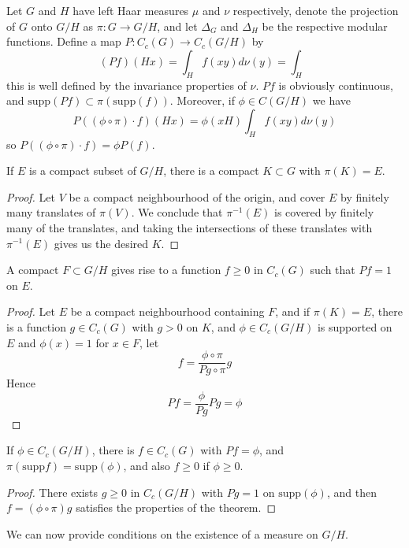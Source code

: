 Let $G$ and $H$ have left Haar measures $\mu$ and $\nu$ respectively, denote the projection of $G$ onto $G/H$ as $\pi: G \to G/H$, and let $\Delta_G$ and $\Delta_H$ be the respective modular functions. Define a map $P: C_c(G) \to C_c(G/H)$ by
%
\[ (Pf)(Hx) = \int_H f(xy) d\nu(y) = \int_H  \]
%
this is well defined by the invariance properties of $\nu$. $Pf$ is obviously continuous, and $\text{supp}(Pf) \subset \pi(\text{supp}(f))$. Moreover, if $\phi \in C(G/H)$ we have
%
\[ P((\phi \circ \pi) \cdot f)(Hx) = \phi(xH) \int_H f(xy) d\nu(y) \]
%
so $P((\phi \circ \pi) \cdot f) = \phi P(f)$.

\begin{lemma}
    If $E$ is a compact subset of $G/H$, there is a compact $K \subset G$ with $\pi(K) = E$.
\end{lemma}
\begin{proof}
    Let $V$ be a compact neighbourhood of the origin, and cover $E$ by finitely many translates of $\pi(V)$. We conclude that $\pi^{-1}(E)$ is covered by finitely many of the translates, and taking the intersections of these translates with $\pi^{-1}(E)$ gives us the desired $K$.
\end{proof}

\begin{lemma}
    A compact $F \subset G/H$ gives rise to a function $f \geq 0$ in $C_c(G)$ such that $Pf = 1$ on $E$.
\end{lemma}
\begin{proof}
    Let $E$ be a compact neighbourhood containing $F$, and if $\pi(K) = E$, there is a function $g \in C_c(G)$ with $g > 0$ on $K$, and $\phi \in C_c(G/H)$ is supported on $E$ and $\phi(x) = 1$ for $x \in F$, let
    \[ f = \frac{\phi \circ \pi}{P g \circ \pi} g \]
    Hence
    \[ Pf = \frac{\phi}{Pg} Pg = \phi \]
\end{proof}

\begin{lemma}
    If $\phi \in C_c(G/H)$, there is $f \in C_c(G)$ with $Pf = \phi$, and $\pi(\text{supp} f) = \text{supp}(\phi)$, and also $f \geq 0$ if $\phi \geq 0$.
\end{lemma}
\begin{proof}
    There exists $g \geq 0$ in $C_c(G/H)$ with $Pg = 1$ on $\text{supp}(\phi)$, and then $f = (\phi \circ \pi) g$ satisfies the properties of the theorem.
\end{proof}

We can now provide conditions on the existence of a measure on $G/H$.

